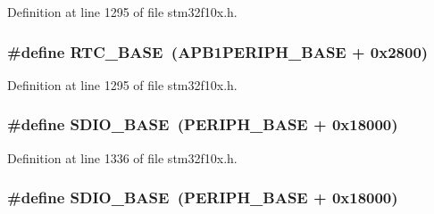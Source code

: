 Definition at line 1295 of file stm32f10x.\+h.

\subsubsection[{\texorpdfstring{R\+T\+C\+\_\+\+B\+A\+SE}{RTC_BASE}}]{\setlength{\rightskip}{0pt plus 5cm}\#define R\+T\+C\+\_\+\+B\+A\+SE~({\bf A\+P\+B1\+P\+E\+R\+I\+P\+H\+\_\+\+B\+A\+SE} + 0x2800)}\hypertarget{group___peripheral__memory__map_ga4265e665d56225412e57a61d87417022}{}\label{group___peripheral__memory__map_ga4265e665d56225412e57a61d87417022}


Definition at line 1295 of file stm32f10x.\+h.

\subsubsection[{\texorpdfstring{S\+D\+I\+O\+\_\+\+B\+A\+SE}{SDIO_BASE}}]{\setlength{\rightskip}{0pt plus 5cm}\#define S\+D\+I\+O\+\_\+\+B\+A\+SE~({\bf P\+E\+R\+I\+P\+H\+\_\+\+B\+A\+SE} + 0x18000)}\hypertarget{group___peripheral__memory__map_ga95dd0abbc6767893b4b02935fa846f52}{}\label{group___peripheral__memory__map_ga95dd0abbc6767893b4b02935fa846f52}


Definition at line 1336 of file stm32f10x.\+h.

\subsubsection[{\texorpdfstring{S\+D\+I\+O\+\_\+\+B\+A\+SE}{SDIO_BASE}}]{\setlength{\rightskip}{0pt plus 5cm}\#define S\+D\+I\+O\+\_\+\+B\+A\+SE~({\bf P\+E\+R\+I\+P\+H\+\_\+\+B\+A\+SE} + 0x18000)}\hypertarget{group___peripheral__memory__map_ga95dd0abbc6767893b4b02935fa846f52}{}\label{group___peripheral__memory__map_ga95dd0abbc6767893b4b02935fa846f52}


